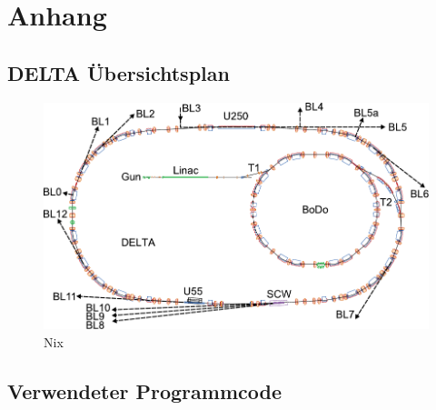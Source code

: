 \section*{Anhang}
\label{sec:Anhang}


\subsection*{DELTA Übersichtsplan}
\label{sec:DELTAoverview}
\begin{figure}
    \centering
    \includegraphics[angle=90]{content/bilder/DeltaOverview.pdf}
    \caption{Nix } 
    \label{fig:DELTAoverview}
  \end{figure}


\subsection*{Verwendeter Programmcode}
\label{sec:Code}